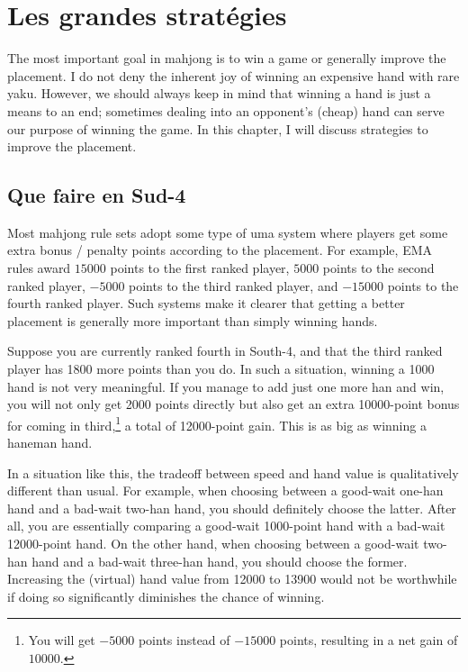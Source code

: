 
\chapter{Les grandes stratégies} \label{ch:grand}
\thispagestyle{empty}
The most important goal in mahjong is to win a game or generally improve the placement. I do not deny the inherent joy of winning an expensive hand with rare {\jap yaku}. However, we should always keep in mind that winning a hand is just a means to an end; sometimes dealing into an opponent's (cheap) hand can serve our purpose of winning the game. 
In this chapter, I will discuss strategies to improve the placement.

\section{Que faire en Sud-4}
Most mahjong rule sets adopt some type of {\jap uma} system where players get some extra bonus / penalty points according to the placement. For example, EMA rules award $15000$ points to the first ranked player, $5000$ points to the second ranked player, $-5000$ points to the third ranked player, and $-15000$ points to the fourth ranked player. 
Such systems make it clearer that getting a better placement is generally more important than simply winning hands. 

\bigskip
Suppose you are currently ranked fourth in South-4, and that the third ranked player has 1800 more points than you do. In such a situation, winning a 1000 hand is not very meaningful. If you manage to add just one more {\jap han} and win, you will not only get 2000 points directly but also get an extra 10000-point bonus for coming in third,\footnote{You will get $-5000$ points instead of $-15000$ points, resulting in a net gain of $10000$.} a total of 12000-point gain. This is as big as winning a {\jap haneman} hand. 

\bigskip
In a situation like this, the tradeoff between speed and hand value is qualitatively different than usual. For example, when choosing between a good-wait one-{\jap han} hand and a bad-wait two-{\jap han} hand, you should definitely choose the latter. After all, you are essentially comparing a good-wait 1000-point hand with a bad-wait 12000-point hand. On the other hand, when choosing between a good-wait two-{\jap han} hand and a bad-wait three-{\jap han} hand, you should choose the former. Increasing the (virtual) hand value from 12000 to 13900 would not be worthwhile if doing so significantly diminishes the chance of winning. 

